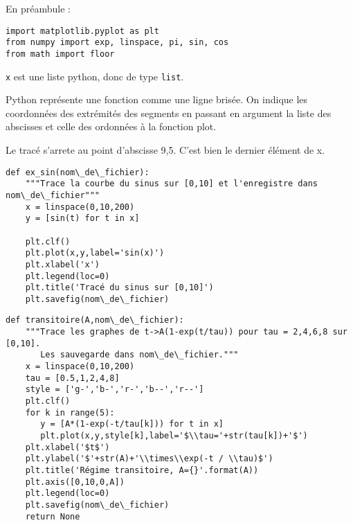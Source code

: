 
En préambule : 
\begin{lstlisting}
import matplotlib.pyplot as plt
from numpy import exp, linspace, pi, sin, cos
from math import floor
\end{lstlisting}


\question{}
\texttt x est une liste python, donc de type \texttt{list}.

\question{}
Python représente une fonction comme une ligne brisée. 
On indique les coordonnées des extrémités des segments en passant en argument la liste des abscisses et celle des ordonnées à la fonction plot.

\question{}
Le tracé s'arrete au point d'abscisse 9,5. C'est bien le dernier élément de x.

\question{}
\begin{lstlisting}
def ex_sin(nom\_de\_fichier):
    """Trace la courbe du sinus sur [0,10] et l'enregistre dans nom\_de\_fichier"""
    x = linspace(0,10,200)
    y = [sin(t) for t in x]

    plt.clf()
    plt.plot(x,y,label='sin(x)')
    plt.xlabel('x')
    plt.legend(loc=0)
    plt.title('Tracé du sinus sur [0,10]')
    plt.savefig(nom\_de\_fichier)
\end{lstlisting}
\question{}
\begin{lstlisting}
def transitoire(A,nom\_de\_fichier):
    """Trace les graphes de t->A(1-exp(t/tau)) pour tau = 2,4,6,8 sur [0,10].
       Les sauvegarde dans nom\_de\_fichier."""
    x = linspace(0,10,200)
    tau = [0.5,1,2,4,8]
    style = ['g-','b-','r-','b--','r--']
    plt.clf()
    for k in range(5):
       y = [A*(1-exp(-t/tau[k])) for t in x]
       plt.plot(x,y,style[k],label='$\\tau='+str(tau[k])+'$') 
    plt.xlabel('$t$')
    plt.ylabel('$'+str(A)+'\\times\\exp(-t / \\tau)$')
    plt.title('Régime transitoire, A={}'.format(A))
    plt.axis([0,10,0,A])
    plt.legend(loc=0)
    plt.savefig(nom\_de\_fichier)
    return None
\end{lstlisting}